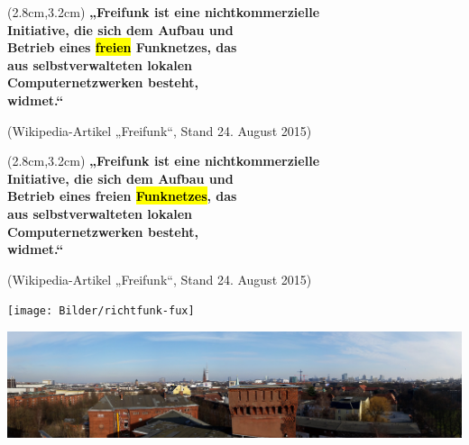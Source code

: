 \documentclass[t]{beamer}
\begin{document}

\begin{frame}{}
    \begin{textblock*}{10cm}(2.8cm,3.2cm)
        \Large\bf
        „Freifunk ist eine nicht\-kommerzielle \\
        Initiative, die sich dem Aufbau und \\
        Betrieb eines \hl{\LARGE freien} Funknetzes, das \\
        aus selbstverwalteten lokalen \\
        Computer\-netzwerken besteht, \\
        widmet.“
    \end{textblock*}

    \vspace{7cm}
    \hspace{4.1cm}
    {\scriptsize(Wikipedia-Artikel „Freifunk“, Stand 24. August 2015)}
\end{frame}




\begin{frame}{}
    \begin{textblock*}{10cm}(2.8cm,3.2cm)
        \Large\bf
        „Freifunk ist eine nicht\-kommerzielle \\
        Initiative, die sich dem Aufbau und \\
        Betrieb eines freien \hl{\LARGE Funknetzes}, das \\
        aus selbstverwalteten lokalen \\
        Computer\-netzwerken besteht, \\
        widmet.“
    \end{textblock*}

    \vspace{7cm}
    \hspace{4.1cm}
    {\scriptsize(Wikipedia-Artikel „Freifunk“, Stand 24. August 2015)}
\end{frame}

\begin{frame}{}
    \begin{center}
        \texttt{[image: Bilder/richtfunk-fux]}
    \end{center}
\end{frame}

\begin{frame}{}
    \vspace{3cm}
    \begin{center}
        \includegraphics[width=1\textwidth]{Bilder/fux-panorama}
    \end{center}
\end{frame}
\end{document}
